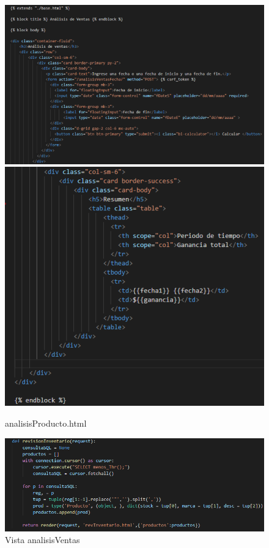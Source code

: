 \documentclass[12pt,letterpaper]{article}
\begin{document}
	\begin{figure}[H]
		\centering
		\includegraphics[scale=0.70]{Documentacion/img/lineasAnalisis.png}
		\includegraphics[scale=0.70]{Documentacion/img/lineasAnalisis2.png}
		\caption{analisisProducto.html}
	\end{figure}
	
	\begin{figure}[H]
		\centering
		\includegraphics[scale=0.50]{Documentacion/img/def_revision.png}
		\caption{Vista analisisVentas}
	\end{figure}
	
\end{document}
